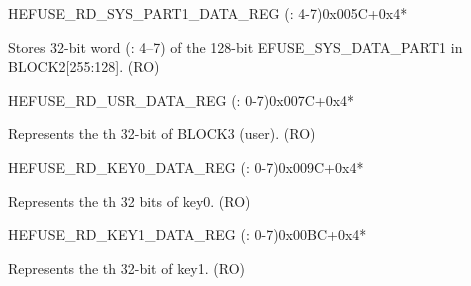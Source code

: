 \begin{register}{H}{EFUSE\_RD\_SYS\_PART1\_DATA\_REG (: 4-7)}{0x005C+0x4*}\label{regdesc:EFUSERDSYSPART1DATA4TO7REG}
%
\regnewline%
\begin{regdesc}\begin{reglist}
\label{fielddesc:EFUSESYSDATAPART1N}\item [EFUSE\_SYS\_DATA\_PART1\_\regindex{n}] Stores 32-bit word  (: 4–7) of the 128-bit EFUSE\_SYS\_DATA\_PART1 in BLOCK2[255:128]. (RO)
\end{reglist}\end{regdesc}
\end{register}


\begin{register}{H}{EFUSE\_RD\_USR\_DATA\_REG (: 0-7)}{0x007C+0x4*}\label{regdesc:EFUSERDUSRDATANREG}
%
\regnewline%
\begin{regdesc}\begin{reglist}
\label{fielddesc:EFUSEUSRDATAN}\item [EFUSE\_USR\_DATA\regindex{n}] Represents the th 32-bit of BLOCK3 (user). (RO)
\end{reglist}\end{regdesc}
\end{register}


\begin{register}{H}{EFUSE\_RD\_KEY0\_DATA\_REG (: 0-7)}{0x009C+0x4*}\label{regdesc:EFUSERDKEY0DATANREG}
%
\regnewline%
\begin{regdesc}\begin{reglist}
\label{fielddesc:EFUSEKEY0DATAN}\item [EFUSE\_KEY0\_DATA\regindex{n}] Represents the th 32 bits of key0. (RO)
\end{reglist}\end{regdesc}
\end{register}


\begin{register}{H}{EFUSE\_RD\_KEY1\_DATA\_REG (: 0-7)}{0x00BC+0x4*}\label{regdesc:EFUSERDKEY1DATANREG}
%
\regnewline%
\begin{regdesc}\begin{reglist}
\label{fielddesc:EFUSEKEY1DATAN}\item [EFUSE\_KEY1\_DATA\regindex{n}] Represents the th 32-bit of key1. (RO)
\end{reglist}\end{regdesc}
\end{register}


